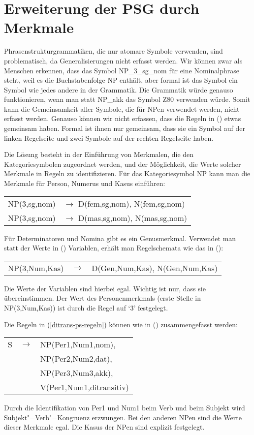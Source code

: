 \section{Erweiterung der PSG durch Merkmale}


Phrasenstrukturgrammatiken, die nur atomare Symbole verwenden, sind problematisch,
da Generalisierungen nicht erfasst werden. Wir können zwar als Menschen erkennen, dass
das Symbol NP\_3\_sg\_nom für eine Nominalphrase steht, weil es die Buchstabenfolge NP
enthält, aber formal ist das Symbol ein Symbol wie jedes andere in der Grammatik. Die Grammatik
würde genauso funktionieren, wenn man statt NP\_akk das Symbol Z80 verwenden würde. Somit kann die
Gemeinsamkeit aller Symbole, die für NPen verwendet werden, nicht erfasst werden. 
Genauso können wir nicht erfassen, dass die Regeln in () etwas gemeinsam haben.
Formal ist ihnen nur gemeinsam, dass sie ein Symbol auf der linken Regelseite und 
zwei Symbole auf der rechten Regelseite haben.

Die Lösung besteht in der Einführung von Merkmalen, die den Kategoriesymbolen
zugeordnet werden, und der Möglichkeit, die Werte solcher Merkmale in Regeln zu identifizieren.
Für das Kategoriesymbol NP kann man \zb die Merkmale für Person, Numerus und Kasus einführen:
\ea
\begin{tabular}[t]{@{}l@{ }l}
NP(3,sg,nom)  & $\to$ D(fem,sg,nom), N(fem,sg,nom)\\
NP(3,sg,nom)  & $\to$ D(mas,sg,nom), N(mas,sg,nom)\\
\end{tabular}
\z
Für Determinatoren und Nomina gibt es ein Genusmerkmal. Verwendet man statt der
Werte in () Variablen, erhält man Regelschemata wie das in ():
\ea
\begin{tabular}[t]{@{}l@{ }l@{ }l}
NP({3},{Num},{Kas}) & $\to$ & D(Gen,{Num},{Kas}), N(Gen,{Num},{Kas})\\
\end{tabular}
\z
Die Werte der Variablen sind hierbei egal. Wichtig ist nur, dass sie übereinstimmen.
Der Wert des Personenmerkmals (erste Stelle in NP(3,Num,Kas)) ist durch die Regel auf `3' festgelegt.

Die Regeln in (\ref{ditrans-ps-regeln}) können wie in () zusammengefasst werden:
\ea
\begin{tabular}[t]{@{}l@{ }l@{ }l}
S  & $\to$ & NP({Per1},{Num1},{nom}), \\
   &       & NP(Per2,Num2,{dat}),\\
   &       & NP(Per3,Num3,{akk}),\\
   &       & V({Per1},{Num1},ditransitiv)\\
\end{tabular}
\z
Durch die Identifikation von Per1 und Num1 beim Verb und beim Subjekt wird Subjekt"=Verb"=Kongruenz erzwungen.
Bei den anderen NPen sind die Werte dieser Merkmale egal. Die Kasus der NPen sind explizit festgelegt.

